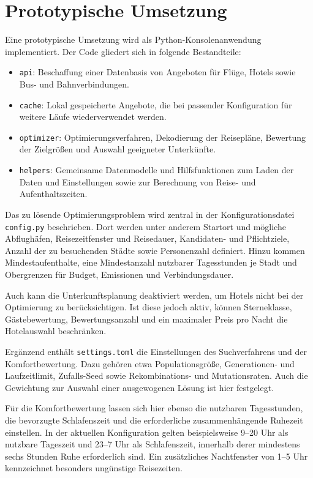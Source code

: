 \section{Prototypische Umsetzung}
\label{sec:prototypische_umsetzung}

Eine prototypische Umsetzung wird als Python-Konsolenanwendung implementiert.
Der Code gliedert sich in folgende Bestandteile:

\begin{itemize}
  \item \texttt{api}: Beschaffung einer Datenbasis von Angeboten für Flüge, Hotels sowie Bus- und Bahnverbindungen.
  \item \texttt{cache}: Lokal gespeicherte Angebote, die bei passender Konfiguration für weitere Läufe wiederverwendet werden.
  \item \texttt{optimizer}: Optimierungsverfahren, Dekodierung der Reisepläne, Bewertung der Zielgrößen und Auswahl geeigneter Unterkünfte.
  \item \texttt{helpers}: Gemeinsame Datenmodelle und Hilfsfunktionen zum Laden der Daten und Einstellungen sowie zur Berechnung von Reise- und Aufenthaltszeiten.
  
\end{itemize}

Das zu lösende Optimierungsproblem wird zentral in der Konfigurationsdatei \texttt{config.py} beschrieben. Dort werden unter anderem Startort
und mögliche Abflughäfen, Reisezeitfenster und Reisedauer, Kandidaten- und
Pflichtziele, Anzahl der zu besuchenden Städte sowie Personenzahl definiert. Hinzu kommen Mindestaufenthalte, eine Mindestanzahl nutzbarer Tagesstunden je Stadt und Obergrenzen für Budget, Emissionen und Verbindungsdauer.

Auch kann die Unterkunftsplanung deaktiviert werden, um Hotels nicht bei der Optimierung zu berücksichtigen. Ist diese jedoch aktiv, können
Sterneklasse, Gästebewertung, Bewertungsanzahl und ein maximaler Preis pro Nacht die Hotelauswahl beschränken.

Ergänzend enthält \texttt{settings.toml} die Einstellungen des Suchverfahrens und der Komfortbewertung. Dazu gehören etwa Populationsgröße, Generationen- und Laufzeitlimit, Zufalls-Seed sowie Rekombinations- und Mutationsraten. Auch die Gewichtung zur Auswahl einer ausgewogenen Lösung ist hier festgelegt.

Für die Komfortbewertung lassen sich hier ebenso die nutzbaren Tagesstunden, die bevorzugte Schlafenszeit und die erforderliche zusammenhängende Ruhezeit einstellen. In der aktuellen Konfiguration gelten beispielsweise 9--20 Uhr als nutzbare Tageszeit und 23--7 Uhr als Schlafenszeit, innerhalb derer mindestens sechs Stunden Ruhe erforderlich sind. Ein zusätzliches Nachtfenster von 1--5 Uhr kennzeichnet besonders ungünstige Reisezeiten. 

